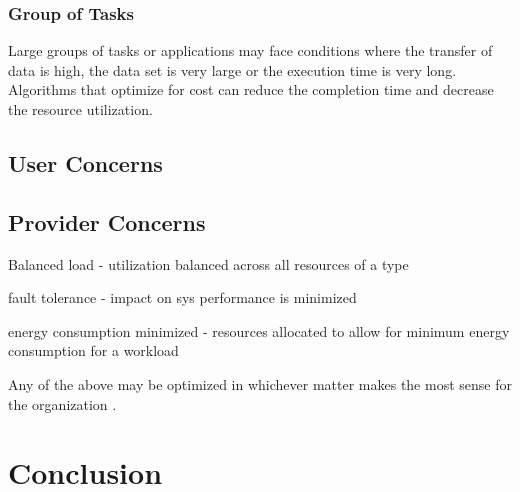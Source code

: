 \documentclass[12pt]{article}
\begin{document}
\subsubsection*{Group of Tasks}

Large groups of tasks or applications may face conditions where the transfer of data is high, the data set is very large or the execution time is very long. Algorithms that optimize for cost can reduce the completion time and decrease the resource utilization.


\subsection{User Concerns}






\subsection{Provider Concerns} \label{provider-concerns}



Balanced load - utilization balanced across all resources of a type

fault tolerance - impact on sys performance is minimized

energy consumption minimized - resources allocated to allow for minimum energy consumption for a workload

Any of the above may be optimized in whichever matter makes the most sense for the organization \cite{Jennings2015}.




\section{Conclusion} \label{sec:conclusion}


\printbibliography
\end{document}
